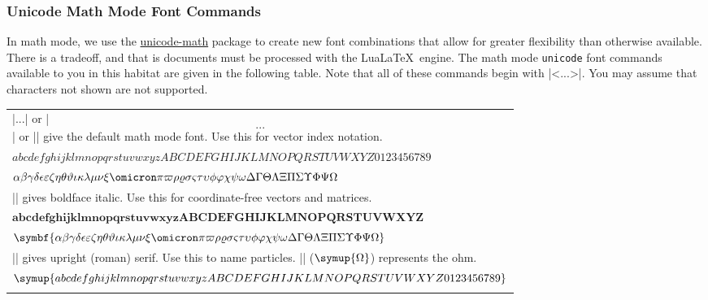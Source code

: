 \documentclass{article}
\newcommand*{\lualatex}{Lua\LaTeX}
\begin{document}
\subsubsection{Unicode Math Mode Font Commands}
In math mode, we use the 
\href{https://www.ctan.org/pkg/unicode-math}{\normalfont\ttfamily\normalfont\ttfamily unicode-math} 
package to create new font combinations 
that allow for greater flexibility than otherwise available. There is a tradeoff, and 
that is documents must be processed with the \lualatex\ engine. The math mode 
\verb|unicode| font commands available to you in this habitat are given in the following 
table. Note that all of these commands begin with |\sym<...>|. You may assume that 
characters not shown are not supported.
\begin{center}
  \begin{tabular}{l}
    |\(...\)| or |\[...\]| or |\symnormal{...}| give the default math mode font. 
    Use this for vector index notation. \\
    \( abcdefghijklmnopqrstuvwxyzABCDEFGHIJKLMNOPQRSTUVWXYZ0123456789 \) \\
    \( 
      \alpha\beta\gamma\delta\epsilon\varepsilon\zeta\eta\theta\vartheta\iota\kappa
      \lambda\mu\nu\xi\omicron\pi\varpi\rho\varrho\sigma\varsigma\tau\upsilon\phi\varphi
      \chi\psi\omega\Delta\Gamma\Theta\Lambda\Xi\Pi\Sigma\Upsilon\Phi\Psi\Omega 
    \) \\
    |\symbf{...}| gives boldface italic. Use this for coordinate-free 
    vectors and matrices. \\
    \( \symbf{abcdefghijklmnopqrstuvwxyzABCDEFGHIJKLMNOPQRSTUVWXYZ} \) \\
    \( \symbf{ 
       \alpha\beta\gamma\delta\epsilon\varepsilon\zeta\eta\theta\vartheta\iota\kappa
       \lambda\mu\nu\xi\omicron\pi\varpi\rho\varrho\sigma\varsigma\tau\upsilon\phi\varphi
       \chi\psi\omega\Delta\Gamma\Theta\Lambda\Xi\Pi\Sigma\Upsilon\Phi\Psi\Omega}
    \) \\
    |\symup{...}| gives upright (roman) serif. Use this to name particles.
    |\symup{\Omega}| (\(\symup{\Omega}\)) represents the ohm. \\
    \( \symup{abcdefghijklmnopqrstuvwxyzABCDEFGHIJKLMNOPQRSTUVWXYZ0123456789} \) \\
    \( \symup{ 
      \alpha\beta\gamma\delta\epsilon\varepsilon\zeta\eta\theta\vartheta\iota\kappa
      \lambda\mu\nu\xi\omicron\pi\varpi\rho\varrho\sigma\varsigma\tau\upsilon\phi\varphi
      \chi\psi\omega\Delta\Gamma\Theta\Lambda\Xi\Pi\Sigma\Upsilon\Phi\Psi\Omega}

\end{tabular}
\end{center}
\end{document}

